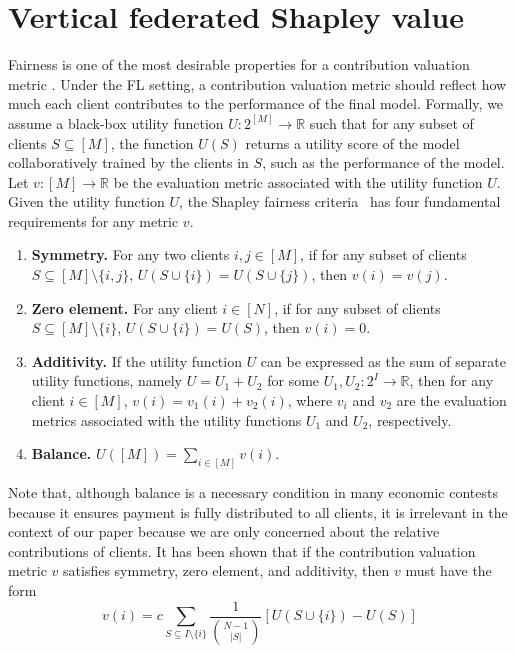 \section{Vertical federated Shapley value} \label{sec:8.4}
Fairness is one of the most desirable properties for a contribution valuation metric \cite{ghorbani2019data,pei2020survey}. Under the FL setting, a contribution valuation metric should reflect how much each client contributes to the performance of the final model. Formally, we assume a black-box utility function $U:2^{[M]} \to \mathbb{R}$ such that for any subset of clients $S \subseteq [M]$, the function $U(S)$ returns a utility score of the model collaboratively trained by the clients in $S$, such as the performance of the model. Let $v: [M] \to \mathbb{R}$ be the evaluation metric associated with the utility function $U$. Given the utility function $U$, the Shapley fairness criteria~\cite{shapley201617} has four fundamental requirements for any metric $v$.
\begin{enumerate}
    \item \textbf{Symmetry.} For any two clients $i, j \in [M]$, if for any subset of clients $S \subseteq [M] \setminus \{i,j\}$, $U(S \cup \{i\}) = U(S \cup \{j\})$, then $v(i) = v(j)$. 
    \item \textbf{Zero element.} For any client $i \in [N]$, if for any subset of clients $S \subseteq [M] \setminus \{i\}$, $U(S \cup \{i\}) = U(S)$, then $v(i) = 0$.
    \item \textbf{Additivity.} If the utility function $U$ can be expressed as the sum of separate utility functions, namely $U = U_1 + U_2$ for some $U_1, U_2 : 2^I \to \mathbb{R}$, then for any client $i \in [M]$, $v(i) = v_1(i) + v_2(i)$, where $v_i$ and $v_2$ are the evaluation metrics associated with the utility functions $U_1$ and $U_2$, respectively. 
    \item \textbf{Balance.}  $U([M]) = \sum_{i \in [M]} v(i)$.
\end{enumerate}
Note that, although balance is a necessary condition in many economic contests because it ensures payment is fully distributed to all clients, it is irrelevant in the context of our paper because we are only concerned about the relative contributions of clients. It has been shown that if the contribution valuation metric $v$ satisfies symmetry, zero element, and additivity, then $v$ must have the form
\begin{equation} \label{eq:shapley2}
    v(i) = c \sum\limits_{S \subseteq I \setminus\{i\}} \frac{1}{\binom{N-1}{|S|}} \left[U(S\cup\{i\}) - U(S)\right]
\end{equation}
